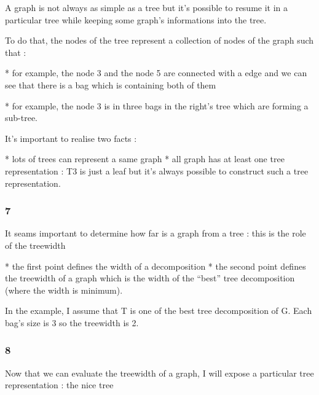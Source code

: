 \documentclass[a4paper, 10pt,french,landscape]{article}
\begin{document}
\begin{multicols}{3}
A graph is not always as simple as a tree but it's possible to resume it  in a particular tree while keeping some graph's informations into the tree. 

To do that, the nodes of the tree represent a collection of nodes of the graph such that : 

* for example, the node 3 and the node 5 are connected with a edge and we can see that there is a bag which is containing both of them

* for example, the node 3 is in three bags in the right's tree which are forming a sub-tree.

It's important to realise two facts : 

* lots of  trees can represent a same graph
* all graph has at least one tree representation : T3 is just a leaf but it's always possible to construct such a tree representation.


\subsubsection*{ 7}


It seams important to determine how far is a graph from a tree : this is the role of the treewidth

* the first point defines the width of a decomposition
* the second point defines the treewidth of a graph which is the width of the ``best'' tree decomposition (where the width is minimum).


In the example, I assume that T is one of the best tree decomposition of G.
Each bag's size is 3 so the treewidth is 2.







\subsubsection*{ 8}

Now that we can evaluate the treewidth of a graph, I will expose a particular tree representation : the nice  tree


\end{multicols}
\end{document}
